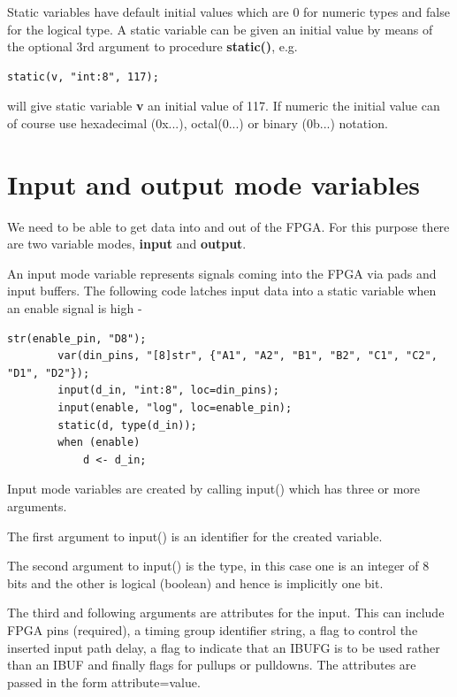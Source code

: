 \documentclass[10pt,a4paper,twoside,fleqn]{article}
\newcommand{\kwd}[1]{{\bf #1}} %
\newcommand{\var}[1]{{\bf #1}} %
\begin{document}
    Static variables have default initial values which are 0 for numeric types
    and false for the logical type. A static variable can be given an initial
    value by means of the optional 3rd argument to procedure \var{static()},
    e.g.
    \begin{lstlisting}[language=threepl]
        static(v, "int:8", 117);
    \end{lstlisting}
    will give static variable \var{v} an initial value of 117. If numeric the
    initial value can of course use hexadecimal (0x...), octal(0...) or binary
    (0b...) notation.
    
\section{Input and output mode variables}

    We need to be able to get data into and out of the FPGA. For this purpose
    there are two variable modes, \kwd{input} and \kwd{output}.
    
    An input mode variable represents signals coming into the FPGA via
    pads and input buffers. The following code latches input data into
    a static variable when an enable signal is high -
    \begin{lstlisting}[language=threepl]
        str(enable_pin, "D8");
        var(din_pins, "[8]str", {"A1", "A2", "B1", "B2", "C1", "C2", "D1", "D2"});
        input(d_in, "int:8", loc=din_pins);
        input(enable, "log", loc=enable_pin);
        static(d, type(d_in));
        when (enable)
            d <- d_in;
    \end{lstlisting}
    Input mode variables are created by calling input() which has three or more
    arguments.

    The first argument to input() is an identifier for the created variable.
    
    The second argument to input() is the type, in this case one is an integer
    of 8 bits and the other is logical (boolean) and hence is implicitly one bit.
    
    The third and following arguments are attributes for the input. This can
    include FPGA pins (required), a timing group identifier string, a flag
    to control the inserted input path delay, a flag to indicate that an IBUFG
    is to be used rather than an IBUF and finally flags for pullups or pulldowns.
    The attributes are passed in the form attribute=value.
    
\end{document}

